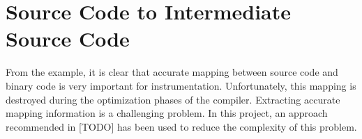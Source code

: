 
%
%
%

\section{Source Code to Intermediate Source Code}
From the example, it is clear that accurate mapping between source code and binary code is very important for instrumentation. Unfortunately, this mapping is destroyed during the optimization phases of the compiler. Extracting accurate mapping information is a challenging problem. In this project, an approach recommended in [TODO] has been used to reduce the complexity of this problem.

